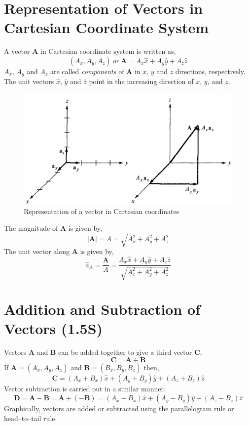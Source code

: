 \documentclass[12pt,a4paper]{article}
\begin{document}
\section{Representation of Vectors in Cartesian Coordinate System}
A vector \textbf{A} in Cartesian coordinate system is written as,
\begin{equation}
(A_x,A_y,A_z)~or~\textbf{A}=A_x\hat{x}+A_y\hat{y}+A_z\hat{z}
\end{equation}
$A_x$, $A_y$ and $A_z$ are called \textit{components} of \textbf{A} in $x$, $y$ and $z$ directions, respectively. The unit vectors $\hat x$, $\hat y$ and $\hat z$ point in the increasing direction of $x$, $y$, and $z$.
\begin{figure}[H]
\includegraphics[scale=0.5]{Figure1-1S.png}
\caption{Representation of a vector in Cartesian coordinates \cite[fig. 1.1]{Sadiku}}
\label{components-of-A}
\end{figure}
The magnitude of \textbf{A} is given by,
\begin{equation}
|\textbf{A}|=A=\sqrt{A_x^2+A_y^2+A_z^2}
\end{equation}
The unit vector along \textbf{A} is given by,
\begin{equation}
\hat{a}_A=\dfrac{\textbf{A}}{A}=\dfrac{A_x\hat{x}+A_y\hat{y}+A_z\hat{z}}{\sqrt{A_x^2+A_y^2+A_z^2}}
\end{equation}
\section{Addition and Subtraction of Vectors (1.5S)}
Vectors \textbf{A} and \textbf{B} can be added together to give a third vector \textbf{C},
\begin{equation}
\textbf{C}=\textbf{A}+\textbf{B}
\end{equation}
If $\textbf{A}=(A_x,A_y,A_z)$ and $\textbf{B}=(B_x,B_y,B_z)$ then,
\begin{equation}
\textbf{C}=(A_x+B_x)\hat x+(A_y+B_y)\hat y+(A_z+B_z)\hat z
\end{equation}
Vector subtraction is carried out in a similar manner.
\begin{equation}
\textbf{D}=\textbf{A}-\textbf{B}=\textbf{A}+(-\textbf{B})=(A_x-B_x)\hat x+(A_y-B_y)\hat y+(A_z-B_z)\hat z
\end{equation}
Graphically, vectors are added or subtracted using the parallelogram rule or head--to--tail rule.
\end{document}
